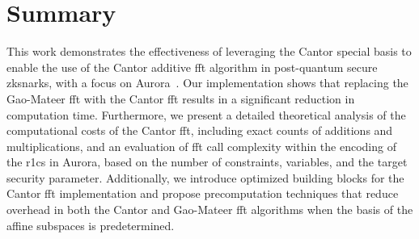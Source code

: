 \section{Summary} \label{Sec:Summary}
This work demonstrates the effectiveness of leveraging the Cantor special basis to enable the use of the Cantor additive \gls{fft} algorithm in post-quantum secure \glspl{zksnark}, with a focus on Aurora~\cite{Aurora2019}. Our implementation shows that replacing the Gao-Mateer \gls{fft} with the Cantor \gls{fft} results in a significant reduction in computation time. Furthermore, we present a detailed theoretical analysis of the computational costs of the Cantor \gls{fft}, including exact counts of additions and multiplications, and an evaluation of \gls{fft} call complexity within the encoding of the \gls{r1cs} in Aurora, based on the number of constraints, variables, and the target security parameter. Additionally, we introduce optimized building blocks for the Cantor \gls{fft} implementation and propose precomputation techniques that reduce overhead in both the Cantor and Gao-Mateer \gls{fft} algorithms when the basis of the affine subspaces is predetermined.

